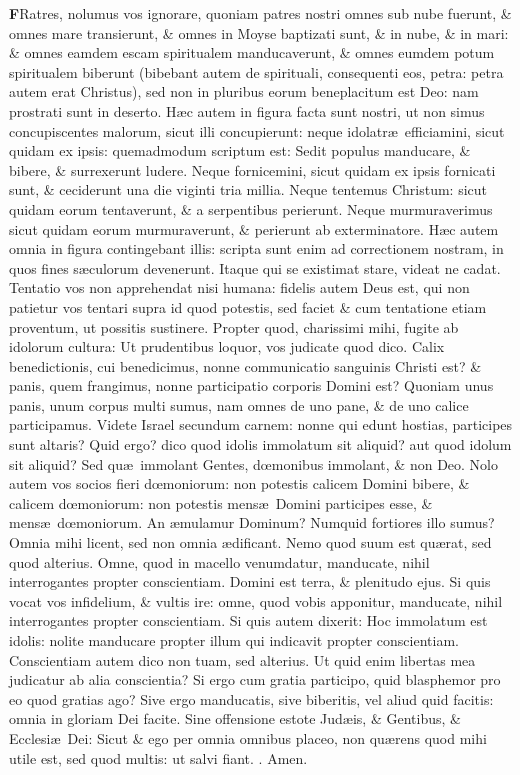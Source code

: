 \documentclass[letter,11pt]{book}
\makeatletter
\DeclareRobustCommand{\Rbar}{\vers@resp{0pt}{R}}
\newcommand{\vers@resp@sym}{\raisebox{0.2ex}{\rotatebox[origin=c]{-20}{$\m@th\rceil$}}}
\newcommand{\vers@resp}[2]{%
  {\ooalign{\hidewidth\kern#1\vers@resp@sym\hidewidth\cr#2\cr}}%
}%
\def\R{\color{Red} \Rbar . \color{black}}
\makeatother
\begin{document}
\begin{multicols*}{2}
\lettrine[lines=2]{\bfseries \color{Red} F}{}Ratres, nolumus vos ignorare, quoniam patres nostri omnes sub nube fuerunt, \& omnes mare transierunt, \& omnes in Moyse baptizati sunt, \& in nube, \& in mari: \& omnes eamdem escam spiritualem manducaverunt, \& omnes eumdem potum spiritualem biberunt (bibebant autem de spirituali, consequenti eos, petra: petra autem erat Christus), sed non in pluribus eorum beneplacitum est Deo: nam prostrati sunt in deserto. H\ae c autem in figura facta sunt nostri, ut non simus concupiscentes malorum, sicut illi concupierunt: neque idolatr\ae \ efficiamini, sicut quidam ex ipsis: quemadmodum scriptum est: Sedit populus manducare, \& bibere, \& surrexerunt ludere. Neque fornicemini, sicut quidam ex ipsis fornicati sunt, \& ceciderunt una die viginti tria millia. Neque tentemus Christum: sicut quidam eorum tentaverunt, \& a serpentibus perierunt. Neque murmuraverimus sicut quidam eorum murmuraverunt, \& perierunt ab exterminatore. H\ae c autem omnia in figura contingebant illis: scripta sunt enim ad correctionem nostram, in quos fines s\ae culorum devenerunt. Itaque qui se existimat stare, videat ne cadat. Tentatio vos non apprehendat nisi humana: fidelis autem Deus est, qui non patietur vos tentari supra id quod potestis, sed faciet \& cum tentatione etiam proventum, ut possitis sustinere. Propter quod, charissimi mihi, fugite ab idolorum cultura: Ut prudentibus loquor, vos judicate quod dico. Calix benedictionis, cui benedicimus, nonne communicatio sanguinis Christi est? \& panis, quem frangimus, nonne participatio corporis Domini est? Quoniam unus panis, unum corpus multi sumus, nam omnes de uno pane, \& de uno calice participamus. Videte Israel secundum carnem: nonne qui edunt hostias, participes sunt altaris? Quid ergo? dico quod idolis immolatum sit aliquid? aut quod idolum sit aliquid? Sed qu\ae \ immolant Gentes, d\oe monibus immolant, \& non Deo. Nolo autem vos socios fieri d\oe moniorum: non potestis calicem Domini bibere, \& calicem d\oe moniorum: non potestis mens\ae \ Domini participes esse, \& mens\ae \ d\oe moniorum. An \ae mulamur Dominum? Numquid fortiores illo sumus? Omnia mihi licent, sed non omnia \ae dificant. Nemo quod suum est qu\ae rat, sed quod alterius. Omne, quod in macello venumdatur, manducate, nihil interrogantes propter conscientiam. Domini est terra, \& plenitudo ejus. Si quis vocat vos infidelium, \& vultis ire: omne, quod vobis apponitur, manducate, nihil interrogantes propter conscientiam. Si quis autem dixerit: Hoc immolatum est idolis: nolite manducare propter illum qui indicavit propter conscientiam. Conscientiam autem dico non tuam, sed alterius. Ut quid enim libertas mea judicatur ab alia conscientia? Si ergo cum gratia participo, quid blasphemor pro eo quod gratias ago? Sive ergo manducatis, sive biberitis, vel aliud quid facitis: omnia in gloriam Dei facite. Sine offensione estote Jud\ae is, \& Gentibus, \& Ecclesi\ae \ Dei: Sicut \& ego per omnia omnibus placeo, non qu\ae rens quod mihi utile est, sed quod multis: ut salvi fiant. \R Amen.

\end{multicols*}
\end{document}
